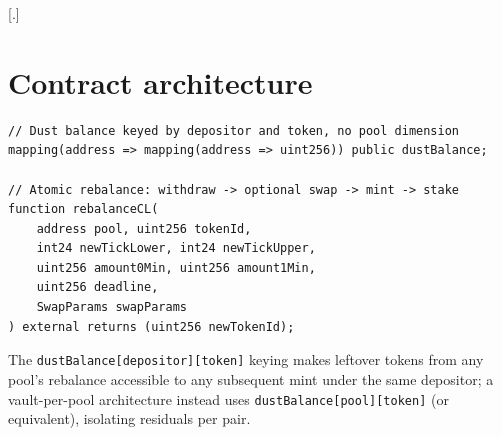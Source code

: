 \documentclass{manuscript}
\begin{document}



\clearpage
\appendix
\setcounter{section}{0}
\renewcommand{\thesection}{\Alph{section}}
\setcounter{secnumdepth}{2}
\renewcommand{\thecorollary}{\thesection.\arabic{corollary}}
\setcounter{corollary}{0}

\titlespacing*{\subsection}{0pt}{10pt}{4pt}

[.]
\titlespacing*{\subsubsection}{0pt}{6pt}{0.5em}

\section{Contract architecture}\label{app:contract}


\begin{verbatim}
// Dust balance keyed by depositor and token, no pool dimension
mapping(address => mapping(address => uint256)) public dustBalance;

// Atomic rebalance: withdraw -> optional swap -> mint -> stake
function rebalanceCL(
    address pool, uint256 tokenId,
    int24 newTickLower, int24 newTickUpper,
    uint256 amount0Min, uint256 amount1Min,
    uint256 deadline,
    SwapParams swapParams
) external returns (uint256 newTokenId);
\end{verbatim}

The \texttt{dustBalance[depositor][token]} keying makes leftover tokens from any pool's rebalance accessible to any subsequent mint under the same depositor; a vault-per-pool architecture instead uses \texttt{dustBalance[pool][token]} (or equivalent), isolating residuals per pair.
\end{document}
